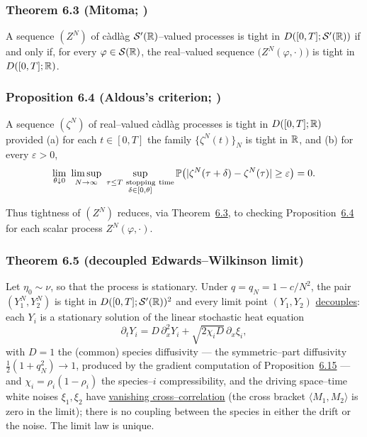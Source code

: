 \documentclass[11pt]{article}
\theoremstyle{plain}
\theoremstyle{definition}
\theoremstyle{remark}
\begin{document}
\subsubsection{Theorem 6.3 (Mitoma; \cite{Mitoma})}\label{thm_mitoma}

A sequence $(Z^N)$ of c\`adl\`ag $\mathcal S'(\mathbb{R})$--valued processes is tight in
$D([0,T];\mathcal S'(\mathbb{R}))$ if and only if, for every $\varphi\in\mathcal S(\mathbb{R})$, the real--valued
sequence $\big(Z^N(\varphi,\cdot)\big)$ is tight in $D([0,T];\mathbb{R})$.
\par

\subsubsection{Proposition 6.4 (Aldous's criterion; \cite{Aldous})}\label{prop_aldous}

A sequence $(\zeta^N)$ of real--valued c\`adl\`ag processes is tight in $D([0,T];\mathbb{R})$
provided \textup{(a)} for each $t\in[0,T]$ the family $\{\zeta^N(t)\}_N$ is tight in
$\mathbb{R}$, and \textup{(b)} for every $\varepsilon>0$,
\[
  \lim_{\theta\downarrow0}\ \limsup_{N\to\infty}\
  \sup_{\substack{\tau\le T\ \mathrm{stopping\ time}\\ \delta\in[0,\theta]}}
  \PP\big(|\zeta^N(\tau+\delta)-\zeta^N(\tau)|\ge\varepsilon\big)=0 .
\]
\par

\noindent Thus tightness of $(Z^N)$ reduces, via Theorem~\hyperref[thm_mitoma]{6.3}, to checking
Proposition~\hyperref[prop_aldous]{6.4} for each scalar process $Z^N(\varphi,\cdot)$.

\subsubsection{Theorem 6.5 (decoupled Edwards--Wilkinson limit)}\label{thm_ewmain}

Let $\eta_0\sim\nu$, so that the process is stationary. Under $q=q_N=1-c/N^2$, the
pair $(Y_1^N,Y_2^N)$ is tight in
$D([0,T];\mathcal S'(\mathbb{R}))^2$ and every limit point $(Y_1,Y_2)$ \underline{decouples}: each $Y_i$ is
a stationary solution of the linear stochastic heat equation
\[
  \partial_t Y_i=D\,\partial_x^2 Y_i+\sqrt{2\chi_i D}\,\partial_x\xi_i,
\]
with $D=1$ the (common) species diffusivity --- the symmetric--part diffusivity
$\tfrac12(1+q_N^2)\to1$, produced by the gradient computation of
Proposition~\hyperref[prop_drift]{6.15} --- and $\chi_i=\rho_i(1-\rho_i)$ the
species--$i$ compressibility,
and the driving space--time white noises $\xi_1,\xi_2$ have \underline{vanishing
cross--correlation} (the cross bracket $\langle M_1,M_2\rangle$ is zero in the limit);
there is no coupling between the species in either the drift or the noise. The limit
law is unique.
\par
\end{document}
